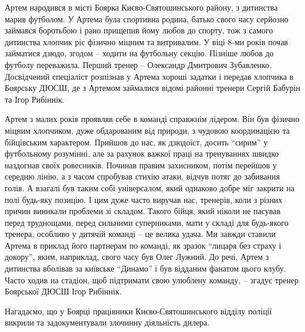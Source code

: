 Артем народився в місті Боярка Києво-Святошинського району, з дитинства  марив
футболом. У Артема була спортивна родина, батько свого часу серйозно займався
боротьбою і рано прищепив йому любов до спорту, тож з самого дитинства хлопчик
ріс фізично міцним та витривалим. У віці 8-ми років почав займатися дзюдо,
згодом – ходити на футбольну секцію. Пізніше любов до футболу переважила.
Перший тренер – Олександр Дмитрович Зубавленко. Досвідчений спеціаліст
розпізнав у Артема хороші задатки і передав хлопчика в Боярську ДЮСШ, де з
Артемом займалися відомі районні тренери Сергій Бабурін та Ігор Рибіннік.

Артем з малих років проявляв себе в команді справжнім лідером. Він був
фізично міцним хлопчиком, дуже обдарованим від природи, з чудовою
координацією та бійцівським характером. Прийшов до нас, як дзюдоїст, досить
\enquote{сирим} у футбольному розумінні, але за рахунок важкої праці на тренуваннях
швидко наздогнав своїх ровесників. Починав правим захисником, потім
перейшов у середню лінію, а з часом спробував стихію атаки, відчув потяг до
забивання голів. А взагалі був таким собі універсалом, який однаково добре
міг закрити на полі будь-яку позицію. І цим дуже часто виручав нас,
тренерів, коли з різних причин виникали проблеми зі складом. Такого бійця,
який ніколи не пасував перед труднощами, перед сильними суперниками, мати у
складі для будь-якого тренера, особливо у дитячій команді – це велика
удача. Ми завжди ставили Артема в приклад його партнерам по команді, як
зразок \enquote{лицаря без страху і докору}, яким, наприклад, свого часу був Олег
Лужний. До речі, Артем з дитинства вболівав за київське \enquote{Динамо} і був
відданим фанатом цього клубу. Часто ходив на стадіон, щоб підтримати свою
улюблену команду, – згадує тренер Боярської ДЮСШ Ігор Рибіннік.

Нагадаємо, що у Боярці працівники Києво-Святошинського відділу поліції викрили
та задокументували злочинну діяльність
дилера.
